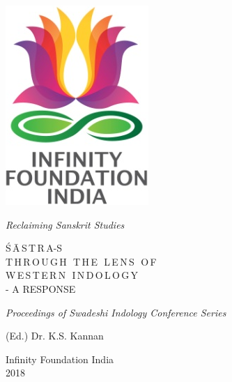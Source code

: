 \thispagestyle{empty}
\begin{center}
\includegraphics[scale=0.3]{figures/logo.png}
\bigskip

{\fontsize{10}{14}\selectfont\sl
Reclaiming Sanskrit Studies}

\bigskip
\end{center}
\medskip

\begin{center}
{\fontsize{20}{24}\selectfont Ś\,Ā\,S\,T\,R\,A-S\\ T\,H\,R\,O\,U\,G\,H\,\, T\,H\,E\,\, L\,E\,N\,S\,\, O\,F\\[10pt] W\,E\,S\,T\,E\,R\,N\,\, I\,N\,D\,O\,L\,O\,G\,Y}\\[8pt]
{\fontsize{15}{24}\selectfont - A RESPONSE}
\bigskip

{\sl\small Proceedings of Swadeshi Indology Conference Series}
\bigskip
\bigskip

{\fontsize{14}{18}\selectfont 
(Ed.) Dr. K.S. Kannan\par
}
\vfill

{\fontsize{12}{14}\selectfont
Infinity Foundation India\\[4pt]
2018}
\end{center}




